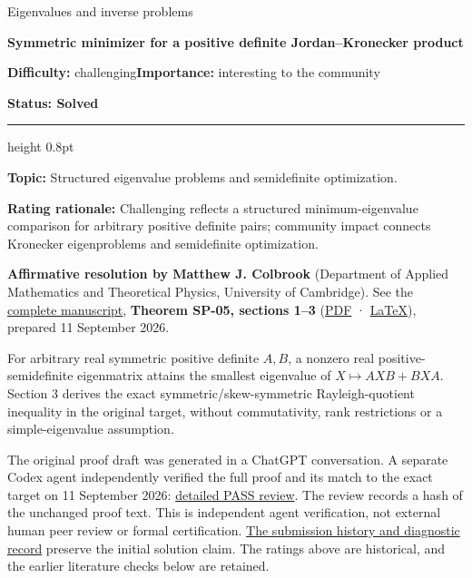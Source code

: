 \documentclass[11pt,a4paper]{article}
\makeatletter
\renewcommand{\subsection}{\Needspace{4\baselineskip}\@startsection{subsection}{2}{0pt}{9pt plus 1pt minus 1pt}{3pt}{\sffamily\bfseries\normalsize\color{ink}}}
\makeatother
\begin{document}
{\sffamily\small\color{muted}Eigenvalues and inverse problems\par}
\vspace{3pt}
{\raggedright{}\sffamily\bfseries\fontsize{21}{24}\selectfont\color{ink}Symmetric
minimizer for a positive definite Jordan--Kronecker product\par}
\vspace{7pt}
{\sffamily\small\textbf{Difficulty:} challenging\quad\textbf{Importance:} interesting
to the community\par}
{\sffamily\small\bfseries\color{accent}Status: Solved\par}
\vspace{4pt}
{\color{accent}\hrule height 0.8pt}
\vspace{6pt}
\textbf{Topic:} Structured eigenvalue problems and semidefinite
optimization.

\textbf{Rating rationale:} Challenging reflects a structured
minimum-eigenvalue comparison for arbitrary positive definite pairs;
community impact connects Kronecker eigenproblems and semidefinite
optimization.

\subsection{Resolution --- 2026-09-11}\label{resolution-2026-09-11}

\textbf{Affirmative resolution by Matthew J. Colbrook} (Department of
Applied Mathematics and Theoretical Physics, University of Cambridge).
See the
\href{https://github.com/ajt60gaibb/OpenProblemsInNLA/blob/main/eigenvalues-and-inverse-problems/SP-05/solution.md}{complete
manuscript}, \textbf{Theorem SP-05, sections 1--3}
(\href{https://github.com/ajt60gaibb/OpenProblemsInNLA/blob/main/eigenvalues-and-inverse-problems/SP-05/solution.pdf}{PDF}
·
\href{https://github.com/ajt60gaibb/OpenProblemsInNLA/blob/main/eigenvalues-and-inverse-problems/SP-05/solution.tex}{LaTeX}),
prepared 11 September 2026.

For arbitrary real symmetric positive definite \(A,B\), a nonzero real
positive-semidefinite eigenmatrix attains the smallest eigenvalue of
\(X\mapsto AXB+BXA\). Section 3 derives the exact
symmetric/skew-symmetric Rayleigh-quotient inequality in the original
target, without commutativity, rank restrictions or a simple-eigenvalue
assumption.

The original proof draft was generated in a ChatGPT conversation. A
separate Codex agent independently verified the full proof and its match
to the exact target on 11 September 2026:
\href{https://github.com/ajt60gaibb/OpenProblemsInNLA/blob/main/references/colbrook-2026-09-11/verification/reviews/SP-05-review.md}{detailed
PASS review}. The review records a hash of the unchanged proof text.
This is independent agent verification, not external human peer review
or formal certification.
\href{https://github.com/ajt60gaibb/OpenProblemsInNLA/blob/main/references/colbrook-2026-09-11/README.md}{The
submission history and diagnostic record} preserve the initial solution
claim. The ratings above are historical, and the earlier literature
checks below are retained.
\end{document}
